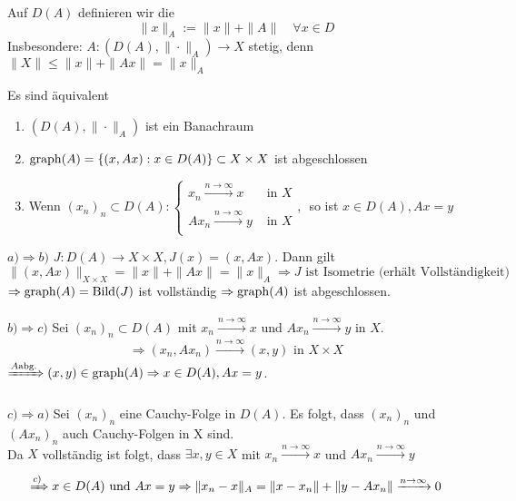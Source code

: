 \begin{definition}
	Auf $D(A)$ definieren wir die 
	\[ \| x \|_{A} := \|x \| + \| A \| \quad \forall x \in D \]
	Insbesondere: $A: (D(A), \| \cdot \|_{A}) \rightarrow X$ stetig, denn $\| X \| \leq \|x \| + \| A x \| = \| x \|_{A}$
\end{definition}


\begin{satz} \label{satz:12.3}
	Es sind äquivalent
	\begin{enumerate}[label=\alph*\upshape)]
		\item $\left( D(A), \| \cdot \|_{A} \right)$ ist ein Banachraum
		\item $\operatorname{graph}(A) = \{ (x, A x): x \in D(A) \} \subset X \times X$ ist abgeschlossen
		\item Wenn $(x_{n})_{n} \subset D(A): \begin{cases}
			x_{n} \xrightarrow[]{n \rightarrow \infty} x & \text{ in } X \\ A x_{n} \xrightarrow[]{n \rightarrow \infty} y & \text{ in } X \end{cases}$, $ $ so ist $x \in D(A), A x = y$
	\end{enumerate}
\end{satz}

\begin{beweis}
	$a) \Rightarrow b)$ $J: D(A) \rightarrow X \times X, J(x) = (x, Ax)$. Dann gilt
		\[ \| (x, Ax) \|_{X \times X} = \| x \| + \| A x \| = \| x \|_{A} \Rightarrow J \text{ ist Isometrie (erhält Vollständigkeit)}  \]
		$\Rightarrow \operatorname{graph}(A) = \mathop{\rm Bild}\nolimits(J)$ ist vollständig $\Rightarrow \operatorname{graph}(A)$ ist abgeschlossen. \\ \\
	$b) \Rightarrow c)$ Sei $(x_{n})_{n} \subset D(A)$ mit $x_{n} \xrightarrow[]{n \rightarrow \infty} x$ und $Ax_{n} \xrightarrow[]{n \rightarrow \infty} y$ in $X$.
		\[ \Rightarrow (x_{n}, A x_{n}) \xrightarrow[]{n \rightarrow \infty} (x, y) \text{ in } X \times X \]
		$\xRightarrow[]{A \text{abg.}} (x, y) \in \operatorname{graph}(A) \Rightarrow x \in D(A), Ax = y$. \\ \\
	$c) \Rightarrow a)$ Sei $(x_{n})_{n}$ eine Cauchy-Folge in $D(A)$. Es folgt, dass $(x_{n})_{n}$ und $(A x_{n})_{n}$ auch Cauchy-Folgen in X sind. \\
	Da $X$ vollständig ist folgt, dass  $\exists x, y \in X$ mit $x_{n} \xrightarrow[]{n \rightarrow \infty} x$ und $A x_{n} \xrightarrow[]{n \rightarrow \infty} y$ \\
	\[ \xRightarrow[]{c)} x \in D(A) \text{ und } A x = y \Rightarrow \|x_{n} - x \|_{A} = \| x - x_{n} \| + \| y - A x_{n} \| \xrightarrow[]{n \rightarrow \infty} 0 \]
\end{beweis}


